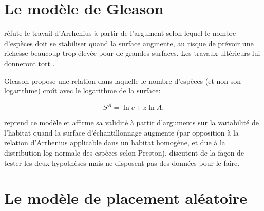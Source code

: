 \documentclass[
  11pt,
  french,
  a4paper,
  extrafontsizes,onecolumn,openright
  ]{memoir}
\newlength{\rf}
\begin{document}
\section{Le modèle de Gleason}\label{sec-Gleason}

\textcite{Gleason1922} réfute le travail d'Arrhenius \autocite*{Arrhenius1921} à partir de l'argument selon lequel le nombre d'espèces doit se stabiliser quand la surface augmente, au risque de prévoir une richesse beaucoup trop élevée pour de grandes surfaces.
Les travaux ultérieurs lui donneront tort \autocite{Williamson2001}.

Gleason propose une relation dans laquelle le nombre d'espèces (et non son logarithme) croît avec le logarithme de la surface:

\begin{equation} 
  \label{eq:Gleason1922}
  S^{A} = \ln{c} + z \ln{A}.
\end{equation}

\textcite{Williams1964} reprend ce modèle et affirme sa validité à partir d'arguments sur la variabilité de l'habitat quand la surface d'échantillonnage augmente (par opposition à la relation d'Arrhenius applicable dans un habitat homogène, et due à la distribution log-normale des espèces selon Preston).
\textcite{Connor1979} discutent de la façon de tester les deux hypothèses mais ne disposent pas des données pour le faire.

\section{Le modèle de placement aléatoire}\label{le-moduxe8le-de-placement-aluxe9atoire}



\scriptsize
\end{document}
